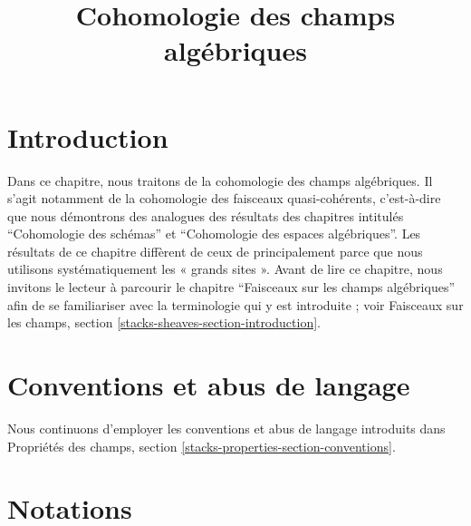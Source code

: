 

%


\title{Cohomologie des champs algébriques}

\maketitle

\label{section-phantom}

\tableofcontents




\section{Introduction}
\label{section-introduction}

\noindent
Dans ce chapitre, nous traitons de la cohomologie des champs algébriques.
Il s'agit notamment de la cohomologie des faisceaux quasi-cohérents, c'est-à-dire que
nous démontrons des analogues des résultats des chapitres intitulés
``Cohomologie des schémas'' et ``Cohomologie des espaces algébriques''.
Les résultats de ce chapitre diffèrent de ceux
de \cite{LM-B} principalement parce que nous utilisons systématiquement les
« grands sites ». Avant de lire ce chapitre, nous invitons le lecteur à parcourir
le chapitre ``Faisceaux sur les champs algébriques'' afin de se
familiariser avec la terminologie qui y est introduite ; voir
Faisceaux sur les champs, section \ref{stacks-sheaves-section-introduction}.



\section{Conventions et abus de langage}
\label{section-conventions}

\noindent
Nous continuons d'employer les conventions et abus de langage
introduits dans
Propriétés des champs, section \ref{stacks-properties-section-conventions}.











\section{Notations}
\label{section-notation}

